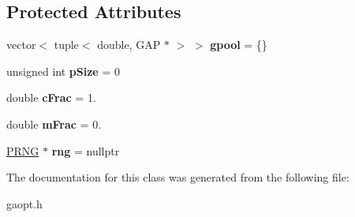 \subsection*{Protected Attributes}
\begin{DoxyCompactItemize}
\item 
\hypertarget{class_k_base_1_1_g_a_opt_a097887d3de46feca8af4ae6aa3f50bc8}{vector$<$ tuple$<$ double, G\-A\-P $\ast$ $>$ $>$ {\bfseries gpool} = \{\}}\label{class_k_base_1_1_g_a_opt_a097887d3de46feca8af4ae6aa3f50bc8}

\item 
\hypertarget{class_k_base_1_1_g_a_opt_a68568fb8b08bcbd64d1f3e2eebc0704d}{unsigned int {\bfseries p\-Size} = 0}\label{class_k_base_1_1_g_a_opt_a68568fb8b08bcbd64d1f3e2eebc0704d}

\item 
\hypertarget{class_k_base_1_1_g_a_opt_a917bf044a35172f2da70b4f9db57e7d9}{double {\bfseries c\-Frac} = 1.}\label{class_k_base_1_1_g_a_opt_a917bf044a35172f2da70b4f9db57e7d9}

\item 
\hypertarget{class_k_base_1_1_g_a_opt_ab3b5fd83355daa4457ab8b19ddb8b9a9}{double {\bfseries m\-Frac} = 0.}\label{class_k_base_1_1_g_a_opt_ab3b5fd83355daa4457ab8b19ddb8b9a9}

\item 
\hypertarget{class_k_base_1_1_g_a_opt_a62a5c058b06b16fcab01909911a37255}{\hyperlink{class_k_base_1_1_p_r_n_g}{P\-R\-N\-G} $\ast$ {\bfseries rng} = nullptr}\label{class_k_base_1_1_g_a_opt_a62a5c058b06b16fcab01909911a37255}

\end{DoxyCompactItemize}


The documentation for this class was generated from the following file\-:\begin{DoxyCompactItemize}
\item 
gaopt.\-h\end{DoxyCompactItemize}
